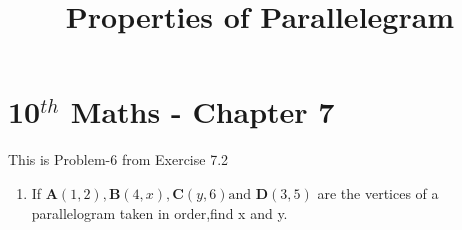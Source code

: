 \documentclass[12pt]{article}
\let\vec\mathbf
\begin{document}
\begin{center}
\title{\textbf{Properties of Parallelegram}}
\date{\vspace{-5ex}} %
\maketitle
\end{center}

\setcounter{page}{1}

\section{10$^{th}$ Maths - Chapter 7}

This is Problem-6 from Exercise 7.2

\begin{enumerate}
\item If $\vec{A}(1, 2),\vec{B}(4, x),\vec{C}(y, 6) \text{and } \vec{D}(3, 5)$ are the vertices of a parallelogram taken in order,find x and y.
\end{enumerate}
\fi
\end{document}
